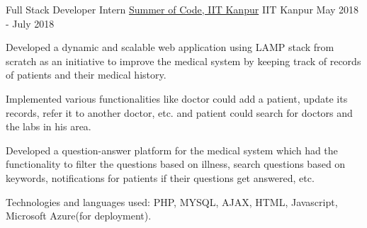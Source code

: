\begin{cventries}
{\cventry
  {Full Stack Developer Intern}
  {\href{https://github.com/sarthak2007/SOC}{Summer of Code, IIT Kanpur}}
  {IIT Kanpur}
  {May 2018 - July 2018}
  {
    \begin{cvitems}
      \item Developed a dynamic and scalable web application using LAMP stack from scratch as an initiative to improve the medical
      system by keeping track of records of patients and their medical history.
      \item Implemented various functionalities like doctor could add a patient, update its records, refer it to another doctor, etc.
      and patient could search for doctors and the labs in his area.
      \item Developed a question-answer platform for the medical system which had the functionality to filter the questions based
      on illness, search questions based on keywords, notifications for patients if their questions get answered, etc.
      \item Technologies and languages used: PHP, MYSQL, AJAX, HTML, Javascript, Microsoft Azure(for deployment).
      \vspace{2mm}
    \end{cvitems}
  }
}
\end{cventries}

